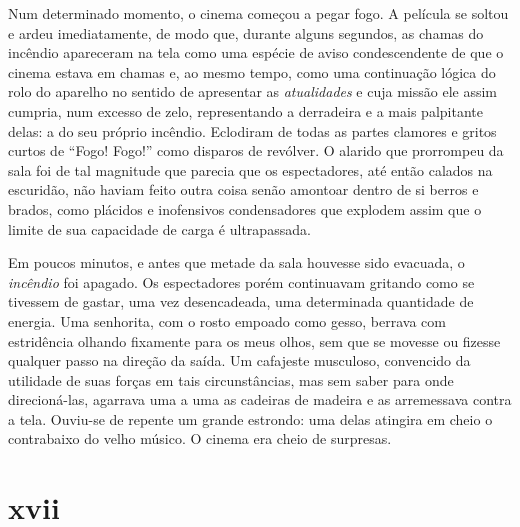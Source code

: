 
Num determinado momento, o cinema começou a pegar fogo. A película se soltou e
ardeu imediatamente, de modo que, durante alguns segundos, as chamas do
incêndio apareceram na tela como uma espécie de aviso condescendente de que o
cinema estava em chamas e, ao mesmo tempo, como uma continuação lógica do
rolo do aparelho no sentido de apresentar as \textit{atualidades} e cuja
missão ele assim cumpria, num excesso de zelo, representando a derradeira e a
mais palpitante delas: a do seu próprio incêndio. Eclodiram de todas as
partes clamores e gritos curtos de ``Fogo! Fogo!'' como disparos de revólver.
O alarido que prorrompeu da sala foi de tal magnitude que parecia que os
espectadores, até então calados na escuridão, não haviam feito outra coisa
senão amontoar dentro de si berros e brados, como plácidos e inofensivos
condensadores que explodem assim que o limite de sua capacidade de carga é
ultrapassada.

Em poucos minutos, e antes que metade da sala houvesse sido evacuada,
o \textit{incêndio} foi apagado. Os espectadores porém continuavam gritando
como se tivessem de gastar, uma vez desencadeada, uma determinada quantidade
de energia. Uma senhorita, com o rosto empoado como gesso, berrava com
estridência olhando fixamente para os meus olhos, sem que se movesse ou
fizesse qualquer passo na direção da saída. Um cafajeste musculoso,
convencido da utilidade de suas forças em tais circunstâncias, mas sem saber
para onde direcioná-las, agarrava uma a uma as cadeiras de madeira e as
arremessava contra a tela. Ouviu-se de repente um grande estrondo: uma delas
atingira em cheio o contrabaixo do velho músico. O cinema era cheio de
surpresas.


\section{xvii} 

